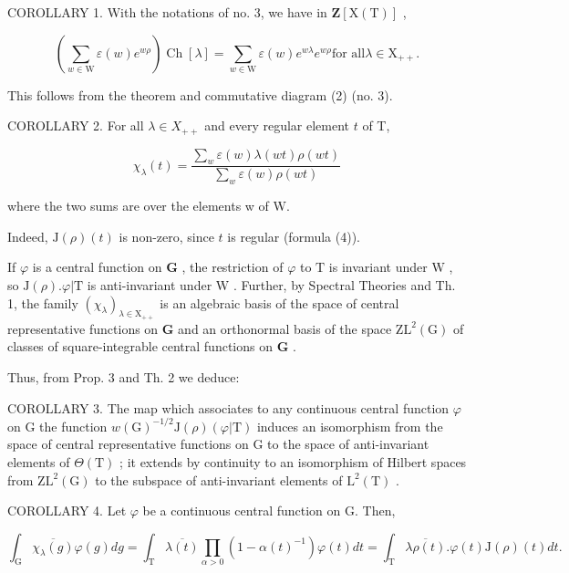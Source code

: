 COROLLARY 1. With the notations of no. 3, we have in \(\mathbf{Z}[\mathrm{X(T)}]\) ,

\[
\left(\sum_ {w \in \mathrm{W}} \varepsilon (w) e ^ {w \rho}\right) \operatorname{Ch} [ \lambda ] = \sum_ {w \in \mathrm{W}} \varepsilon (w) e ^ {w \lambda} e ^ {w \rho} \text {for all} \lambda \in \mathrm{X} _ {+ +}.
\]

This follows from the theorem and commutative diagram (2) (no. 3).

COROLLARY 2. For all \(\lambda \in X_{++}\) and every regular element \(t\) of T,

\[
\chi_ {\lambda} (t) = \frac {\sum_ {w} \varepsilon (w) \lambda (w t) \rho (w t)}{\sum_ {w} \varepsilon (w) \rho (w t)}\tag{5}
\]

where the two sums are over the elements w of W.

Indeed, \(\mathrm{J}(\rho)(t)\) is non-zero, since \(t\) is regular (formula (4)).

If \(\varphi\) is a central function on \(\mathbf{G}\) , the restriction of \(\varphi\) to \(\mathrm{T}\) is invariant under \(\mathrm{W}\) , so \(\mathrm{J}(\rho). \varphi|\mathrm{T}\) is anti-invariant under \(\mathrm{W}\) . Further, by Spectral Theories and Th. 1, the family \((\chi_{\lambda})_{\lambda \in \mathrm{X}_{++}}\) is an algebraic basis of the space of central representative functions on \(\mathbf{G}\) and an orthonormal basis of the space \(\mathrm{ZL}^2(\mathrm{G})\) of classes of square-integrable central functions on \(\mathbf{G}\) .

Thus, from Prop. 3 and Th. 2 we deduce:

COROLLARY 3. The map which associates to any continuous central function \(\varphi\) on G the function \(w(\mathrm{G})^{-1/2}\mathrm{J}(\rho)(\varphi|\mathrm{T})\) induces an isomorphism from the space of central representative functions on G to the space of anti-invariant elements of \(\Theta(\mathrm{T})\) ; it extends by continuity to an isomorphism of Hilbert spaces from \(\mathrm{ZL}^2(\mathrm{G})\) to the subspace of anti-invariant elements of \(\mathrm{L}^2(\mathrm{T})\) .

COROLLARY 4. Let \(\varphi\) be a continuous central function on G. Then,

\[
\int_ {\mathrm{G}} \overline {{\chi_ {\lambda} (g)}} \varphi (g) d g = \int_ {\mathrm{T}} \overline {{\lambda (t)}} \prod_ {\alpha > 0} (1 - \alpha (t) ^ {- 1}) \varphi (t) d t = \int_ {\mathrm{T}} \overline {{\lambda \rho (t)}}. \varphi (t) \mathrm{J} (\rho) (t) d t.
\]

